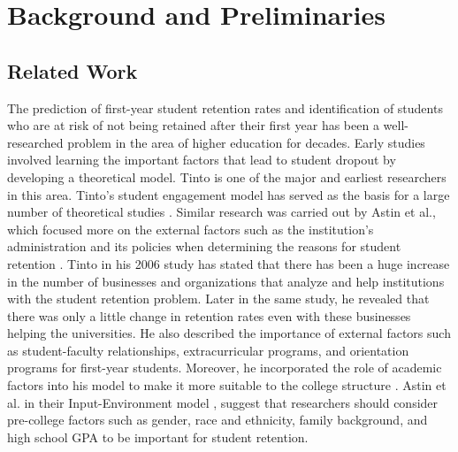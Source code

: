 \documentclass[11pt,openright]{report}
\begin{document}
\chapter{Background and Preliminaries} \label{chapter:background}
\section{Related Work}\label{section:relatedwork}

The prediction of first-year student retention rates and identification of students who are at risk of not being retained after their first year has been a well-researched problem in the area of higher education for decades. Early studies involved learning the important factors that lead to student dropout by developing a theoretical model. Tinto is one of the major and earliest researchers in this area. Tinto's student engagement model \cite{tinto1999taking} has served as the basis for a large number of theoretical studies \cite{braxton2002introduction}. Similar research was carried out by Astin et al., which focused more on the external factors such as the institution's administration and its policies when determining the reasons for student retention \cite{astin2012assessment}. Tinto in his 2006 study \cite{tinto2006} has stated that there has been a huge increase in the number of businesses and organizations that analyze and help institutions with the student retention problem. Later in the same study, he revealed that there was only a little change in retention rates even with these businesses helping the universities. He also described the importance of external factors such as student-faculty relationships, extracurricular programs, and orientation programs for first-year students. Moreover, he incorporated the role of academic factors into his model to make it more suitable to the college structure \cite{tinto2006}. Astin et al. in their Input-Environment model \cite{astin2012assessment}, suggest that researchers should consider pre-college factors such as gender, race and ethnicity, family background, and high school GPA  to be important for student retention.
\end{document}
